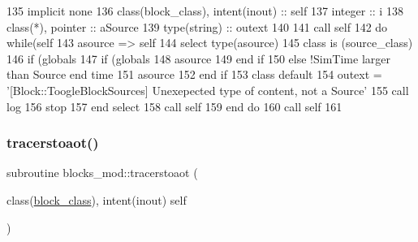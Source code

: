 \begin{DoxyCode}
135     \textcolor{keywordtype}{implicit none}
136     \textcolor{keywordtype}{class}(block\_class), \textcolor{keywordtype}{intent(inout)} :: self
137     \textcolor{keywordtype}{integer} :: i
138     \textcolor{keywordtype}{class}(*), \textcolor{keywordtype}{pointer} :: aSource
139     \textcolor{keywordtype}{type}(string) :: outext
140 
141     \textcolor{keyword}{call }self%
142     \textcolor{keywordflow}{do} \textcolor{keywordflow}{while}(self%
143         asource => self%
144         \textcolor{keywordflow}{select type}(asource)
145 \textcolor{keywordflow}{        class is} (source\_class)
146             \textcolor{keywordflow}{if} (globals%
147                 \textcolor{keywordflow}{if} (globals%
148                     asource%
149 \textcolor{keywordflow}{                end if}
150             \textcolor{keywordflow}{else}            \textcolor{comment}{!SimTime larger than Source end time}
151                 asource%
152 \textcolor{keywordflow}{            end if}
153 \textcolor{keywordflow}{            class default}
154             outext = \textcolor{stringliteral}{'[Block::ToogleBlockSources] Unexepected type of content, not a Source'}
155             \textcolor{keyword}{call }log%
156             stop
157 \textcolor{keywordflow}{        end select}
158         \textcolor{keyword}{call }self%
159 \textcolor{keywordflow}{    end do}
160     \textcolor{keyword}{call }self%
161 
\end{DoxyCode}
\mbox{\label{namespaceblocks__mod_ae7afa742f8f89a6a8afdefb7f8c87efd}} 
\subsubsection{\texorpdfstring{tracerstoaot()}{tracerstoaot()}}
{\footnotesize\ttfamily subroutine blocks\+\_\+mod\+::tracerstoaot (\begin{DoxyParamCaption}\item[{class(\mbox{\hyperlink{structblocks__mod_1_1block__class}{block\+\_\+class}}), intent(inout)}]{self }\end{DoxyParamCaption})\hspace{0.3cm}{\ttfamily [private]}}



